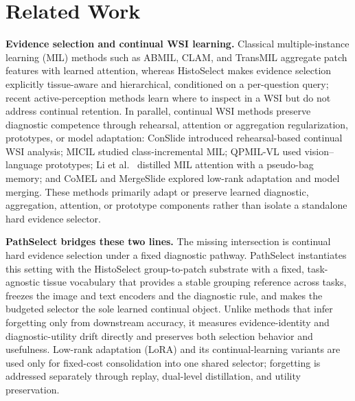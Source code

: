 \documentclass{article}
\begin{document}
\section{Related Work}
\label{sec:related}

\textbf{Evidence selection and continual WSI learning.}
Classical multiple-instance learning (MIL) methods such as ABMIL, CLAM, and TransMIL \cite{ilse2018abmil,lu2021clam,shao2021transmil} aggregate patch features with learned attention, whereas HistoSelect \cite{huang2026histoselect} makes evidence selection explicitly tissue-aware and hierarchical, conditioned on a per-question query; recent active-perception methods learn where to inspect in a WSI \cite{chen2026adaptivepath} but do not address continual retention. In parallel, continual WSI methods preserve diagnostic competence through rehearsal, attention or aggregation regularization, prototypes, or model adaptation: ConSlide \cite{huang2023conslide} introduced rehearsal-based continual WSI analysis; MICIL \cite{meseguer2024micil} studied class-incremental MIL; QPMIL-VL \cite{gou2025qpmil} used vision--language prototypes; Li et al.\ \cite{li2025akd} distilled MIL attention with a pseudo-bag memory; and CoMEL \cite{lee2025comel} and MergeSlide \cite{bui2026mergeslide} explored low-rank adaptation and model merging. These methods primarily adapt or preserve learned diagnostic, aggregation, attention, or prototype components rather than isolate a standalone hard evidence selector.

\textbf{PathSelect bridges these two lines.}
The missing intersection is continual hard evidence selection under a fixed diagnostic pathway. PathSelect instantiates this setting with the HistoSelect group-to-patch substrate with a fixed, task-agnostic tissue vocabulary that provides a stable grouping reference across tasks, freezes the image and text encoders and the diagnostic rule, and makes the budgeted selector the sole learned continual object. Unlike methods that infer forgetting only from downstream accuracy, it measures evidence-identity and diagnostic-utility drift directly and preserves both selection behavior and usefulness. Low-rank adaptation (LoRA) \cite{hu2022lora} and its continual-learning variants \cite{liang2024inflora,wu2025sdlora,he2025cllora,chen2026flexem} are used only for fixed-cost consolidation into one shared selector; forgetting is addressed separately through replay, dual-level distillation, and utility preservation.
\end{document}
